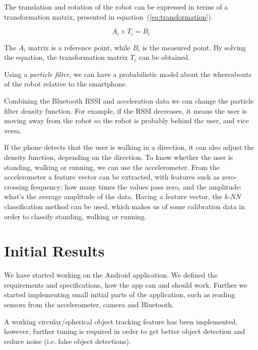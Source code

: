 \documentclass[a4paper,10pt]{article}
\begin{document}
The translation and rotation of the robot can be expressed in terms of a transformation matrix, presented in equation~(\ref{eq:transformation}).

\begin{equation}
A_{i} \times T_{i} = B_{i}
\label{eq:transformation}
\end{equation}

The $A_{i}$ matrix is a reference point, while $B_{i}$ is the measured point. By solving the equation, the transformation matrix $T_{i}$ can be obtained.

Using a \emph{particle filter}, we can have a probabilistic model about the whereabouts of the robot relative to the smartphone.

Combining the Bluetooth RSSI and acceleration data we can change the particle filter density function. For example, if the RSSI decreases, it means the user is moving away from the robot so the robot is probably behind the user, and vice versa.

If the phone detects that the user is walking in a direction, it can also
adjust the density function, depending on the direction. To know whether the user is standing, walking or running, we can use the accelerometer. From the accelerometer a feature vector can be extracted, with features such as zero-crossing frequency: how many times the values pass zero, and the amplitude: what's the average amplitude of the data. Having a feature vector, the \emph{k-NN} classification method can be used, which makes us of some calibration data in order to classify standing, walking or running.

\section{Initial Results}

We have started working on the Android application. We defined the requirements and specifications, how the app can and should work. Further we started implementing small initial parts of the application, such as reading sensors from the accelerometer, camera and Bluetooth.

A working circular/spherical object tracking feature has been implemented, however, further tuning is required in order to get better object detection and reduce noise (i.e. false object detections).
\end{document}
